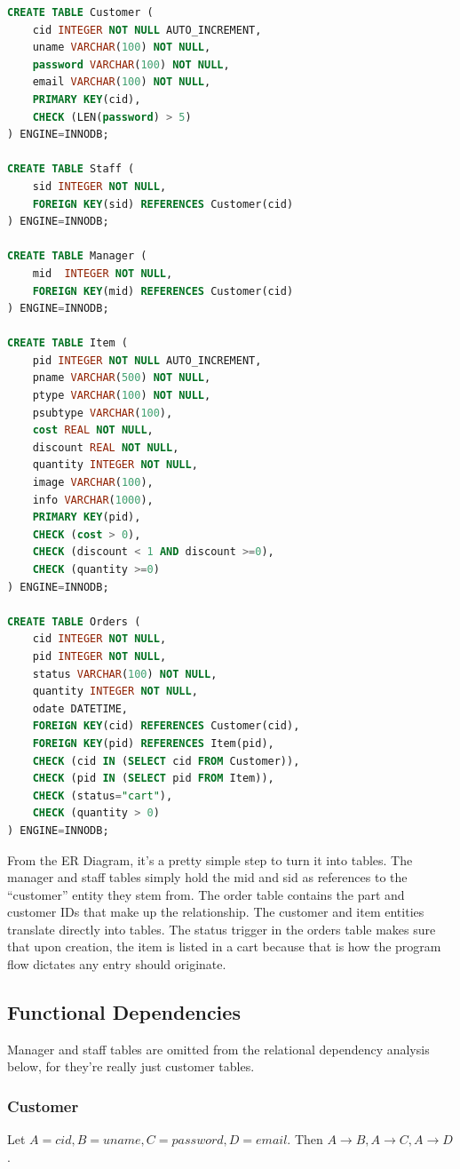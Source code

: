 \documentclass[letterpaper]{article}
\begin{document}
\begin{adjustwidth}{2cm}{0cm}
\begin{lstlisting}[language=sql]
CREATE TABLE Customer (
	cid INTEGER NOT NULL AUTO_INCREMENT,
	uname VARCHAR(100) NOT NULL,
	password VARCHAR(100) NOT NULL,
	email VARCHAR(100) NOT NULL,
	PRIMARY KEY(cid),
	CHECK (LEN(password) > 5)
) ENGINE=INNODB;

CREATE TABLE Staff (
	sid INTEGER NOT NULL,
	FOREIGN KEY(sid) REFERENCES Customer(cid)
) ENGINE=INNODB;

CREATE TABLE Manager (
	mid  INTEGER NOT NULL,
	FOREIGN KEY(mid) REFERENCES Customer(cid)
) ENGINE=INNODB;

CREATE TABLE Item (
	pid INTEGER NOT NULL AUTO_INCREMENT,
	pname VARCHAR(500) NOT NULL,
	ptype VARCHAR(100) NOT NULL,
	psubtype VARCHAR(100),
	cost REAL NOT NULL,
	discount REAL NOT NULL,
	quantity INTEGER NOT NULL,
	image VARCHAR(100),
	info VARCHAR(1000),
	PRIMARY KEY(pid),
	CHECK (cost > 0),
	CHECK (discount < 1 AND discount >=0),
	CHECK (quantity >=0)
) ENGINE=INNODB;

CREATE TABLE Orders (
	cid INTEGER NOT NULL,
	pid INTEGER NOT NULL,
	status VARCHAR(100) NOT NULL,
	quantity INTEGER NOT NULL,
	odate DATETIME,
	FOREIGN KEY(cid) REFERENCES Customer(cid),
	FOREIGN KEY(pid) REFERENCES Item(pid),
	CHECK (cid IN (SELECT cid FROM Customer)),
	CHECK (pid IN (SELECT pid FROM Item)),
	CHECK (status="cart"),
	CHECK (quantity > 0)
) ENGINE=INNODB;
\end{lstlisting}
\end{adjustwidth}

From the ER Diagram, it’s a pretty simple step to turn it into tables.  The manager and staff tables simply hold the mid and sid as references to the “customer” entity they stem from.  The order table contains the part and customer IDs that make up the relationship.  The customer and item entities translate directly into tables.  The status trigger in the orders table makes sure that upon creation, the item is listed in a cart because that is how the program flow dictates any entry should originate.

\subsection{Functional Dependencies}
Manager and staff tables are omitted from the relational dependency analysis below, for they’re really just customer tables.

\subsubsection{Customer}
Let $A=cid, B=uname, C=password, D=email.$ Then $A \rightarrow B, A \rightarrow C, A \rightarrow D$.  
\end{document}
